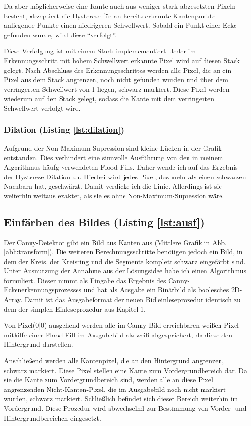 Da aber möglicherweise eine Kante auch aus weniger stark abgesetzten Pixeln besteht, akzeptiert die Hysterese für an bereits erkannte Kantenpunkte anliegende Punkte einen niedrigeren Schwellwert. Sobald ein Punkt einer Ecke gefunden wurde, wird diese "`verfolgt"'.

Diese Verfolgung ist mit einem Stack implemementiert. Jeder im Erkennungsschritt mit hohem Schwellwert erkannte Pixel wird auf diesen Stack gelegt. Nach Abschluss des Erkennungsschrittes werden alle Pixel, die an ein Pixel aus dem Stack angrenzen, noch nicht gefunden wurden und über dem verringerten Schwellwert von 1 liegen, schwarz markiert. Diese Pixel werden wiederum auf den Stack gelegt, sodass die Kante mit dem verringerten Schwellwert verfolgt wird. 

\subsubsection{Dilation (Listing \ref{lst:dilation})}
Aufgrund der Non-Maximum-Supression sind kleine Lücken in der Grafik entstanden. Dies verhindert eine sinnvolle Ausführung von den in meinem Algorithmus häufg verwendeten Flood-Fills. Daher wende ich auf das Ergebnis der Hysterese Dilation an. Hierbei wird jedes Pixel, das mehr als einen schwarzen Nachbarn hat, geschwärzt.
Damit verdicke ich die Linie. Allerdings ist sie weiterhin weitaus exakter, als sie es ohne Non-Maximum-Supression wäre.

\subsection{Einfärben des Bildes (Listing \ref{lst:ausf})}
Der Canny-Detektor gibt ein Bild aus Kanten aus (Mittlere Grafik in Abb. \ref{abb:transform}). Die weiteren Berechnungsschritte benötigen jedoch ein Bild, in dem der Kreis, der Kreisring und die Segmente komplett schwarz eingefärbt sind. Unter Ausnutzung der Annahme aus der Lösungsidee habe ich einen Algorithmus formuliert.
Dieser nimmt als Eingabe das Ergebnis des Canny-Eckenerkennungsprozesses und hat als Ausgabe ein Binärbild als boolesches 2D-Array. Damit ist das Ausgabeformat der neuen Bidleinleseprozedur identisch zu dem der simplen Einleseprozedur aus Kapitel 1.

Von Pixel(0|0) ausgehend werden alle im Canny-Bild erreichbaren weißen Pixel mithilfe einer Flood-Fill im Ausgabebild als weiß abgespeichert, da diese den Hintergrund darstellen.

Anschließend werden alle Kantenpixel, die an den Hintergrund angrenzen, schwarz markiert. Diese Pixel stellen eine Kante zum Vordergrundbereich dar.
Da sie die Kante zum Vordergrundbereich sind, werden alle an diese Pixel angrenzenden Nicht-Kanten-Pixel, die im Ausgabebild noch nicht markiert wurden, schwarz markiert. Schließlich befindet sich dieser Bereich weiterhin im Vordergrund.
Diese Prozedur wird abwechselnd zur Bestimmung von Vorder- und Hintergrundbereichen eingesetzt.

